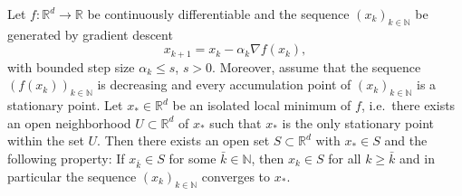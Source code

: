 \documentclass[12pt,openany]{book}
\theoremstyle{definition}
\theoremstyle{definition}
\newcommand{\N}{\mathbb{N}}
\newcommand{\R}{\mathbb{R}}
\begin{document}
\begin{thm}
Let $f:\R^d\to \R$ be continuously differentiable and the sequence $(x_k)_{k\in\N}$ be generated by gradient descent
\[x_{k+1} = x_k - \alpha_k \nabla f(x_k), \]
with bounded step size $\alpha_k\le s$, $s>0$. Moreover, assume that the sequence $(f(x_k))_{k\in\N}$ is decreasing and every accumulation point of $(x_k)_{k\in\N}$ is a stationary point. Let $x_\ast\in\R^d$ be an isolated local minimum of $f$, i.e.~there exists an open neighborhood $U\subset \R^d$ of $x_\ast$ such that $x_\ast$ is the only stationary point within the set $U$. Then there exists an open set $S\subset \R^d$ with $x_\ast\in S$ and the following property: If $x_{\bar k}\in S$ for some $\bar k\in\N$, then $x_k\in S$ for all $k\ge \bar k$ and in particular the sequence $(x_k)_{k\in\N}$ converges to $x_\ast$.
\end{thm}
\end{document}
